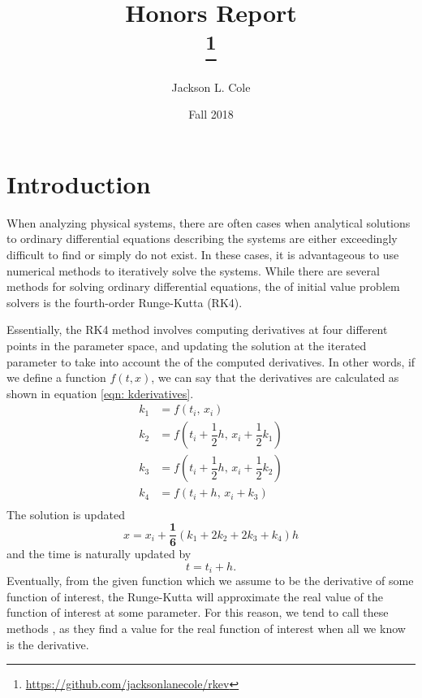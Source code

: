 \documentclass[onecolumn,titlepage,letterpaper,10pt]{article}
\title{Honors Report\\
\large \theWorkingTitle\thanks{\url{https://github.com/jacksonlanecole/rkev}}}
\author{Jackson L. Cole}
\affil{Department of Physics and Astronomy, Middle Tennessee State University}
\date{Fall 2018}
\newcommand{\functionof}[2]{#1\left(#2\right)}
\newcommand{\paren}[1]{\left(#1\right)}
\begin{document}

\maketitle
\tableofcontents
\listoffigures
\doublespacing

\section{Introduction}
When analyzing physical systems, there are often cases when analytical
solutions to ordinary differential equations describing the systems
are either exceedingly difficult to find or simply do not exist.
In these cases, it is advantageous to use numerical methods to
iteratively solve the systems. While there are several methods for solving ordinary
differential equations, the  of initial value problem solvers is
the fourth-order Runge-Kutta (RK4). \cite{holmes_2018}

Essentially, the RK4 method involves computing derivatives at
four different points in the parameter space, and updating the solution at the
iterated parameter to take into account the 
of the computed
derivatives. In other words, if we define a function $\functionof{f}{t, x}$, we
can say that the derivatives are calculated as shown in equation \eqref{eqn:
kderivatives}.
\begin{equation}
\begin{aligned}
    k_1 &= \functionof{f}{t_i,\, x_i}\\
    k_2 &= \functionof{f}{t_i + \dfrac{1}{2}h,\, x_i + \dfrac{1}{2}k_1}\\
    k_3 &= \functionof{f}{t_i + \dfrac{1}{2}h,\, x_i + \dfrac{1}{2}k_2}\\
    k_4 &= \functionof{f}{       t_i + h,\,        x_i + k_3}\\
    \label{eqn: kderivatives}
\end{aligned}
\end{equation}
The solution is updated
\begin{equation}
    x   = x_i + \mathbf{\dfrac{1}{6}}\paren{k_1 + 2k_2 + 2k_3 + k_4}h
\end{equation}
and the time is naturally updated by
\begin{equation}
    \label{eqn: time update}
    t = t_i + h.
\end{equation}
Eventually, from the given function which we assume to be the derivative of some
function of interest, the Runge-Kutta will approximate the real value of the
function of interest at some parameter. For this reason, we tend to call these
methods , as they find a value for the real function of
interest when all we know is the derivative.
\end{document}
